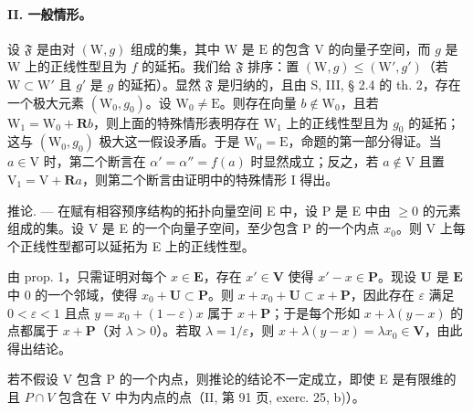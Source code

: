 \paragraph{II. 一般情形。}

设 \(\mathfrak{F}\) 是由对 \((\mathrm{W}, g)\) 组成的集，其中 \(\mathrm{W}\) 是 \(\mathrm{E}\) 的包含 \(\mathrm{V}\) 的向量子空间，而 \(g\) 是 \(\mathrm{W}\) 上的正线性型且为 \(f\) 的延拓。我们给 \(\mathfrak{F}\) 排序：置 \((\mathrm{W}, g) \leqslant (\mathrm{W}', g')\)（若 \(\mathrm{W} \subset \mathrm{W}'\) 且 \(g'\) 是 \(g\) 的延拓）。显然 \(\mathfrak{F}\) 是归纳的，且由 S, III, § 2.4 的 th. 2，存在一个极大元素 \((\mathrm{W}_0, g_0)\)。设 \(\mathrm{W}_0 \neq \mathrm{E}\)。则存在向量 \(b \notin \mathrm{W}_0\)，且若 \(\mathrm{W}_1 = \mathrm{W}_0 + \mathbf{R}b\)，则上面的特殊情形表明存在 \(\mathrm{W}_1\) 上的正线性型且为 \(g_0\) 的延拓；这与 \((\mathrm{W}_0, g_0)\) 极大这一假设矛盾。于是 \(\mathrm{W}_0 = \mathrm{E}\)，命题的第一部分得证。当 \(a \in \mathrm{V}\) 时，第二个断言在 \(\alpha' = \alpha'' = f(a)\) 时显然成立；反之，若 \(a \notin \mathrm{V}\) 且置 \(\mathrm{V}_1 = \mathrm{V} + \mathbf{R}a\)，则第二个断言由证明中的特殊情形 I 得出。

推论. --- 在赋有相容预序结构的拓扑向量空间 E 中，设 P 是 E 中由 \(\geqslant 0\) 的元素组成的集。设 V 是 E 的一个向量子空间，至少包含 P 的一个内点 \(x_{0}\)。则 V 上每个正线性型都可以延拓为 E 上的正线性型。

由 prop. 1，只需证明对每个 \(x \in \mathbf{E}\)，存在 \(x' \in \mathbf{V}\) 使得 \(x' - x \in \mathbf{P}\)。现设 \(\mathbf{U}\) 是 \(\mathbf{E}\) 中 0 的一个邻域，使得 \(x_0 + \mathbf{U} \subset \mathbf{P}\)。则 \(x + x_0 + \mathbf{U} \subset x + \mathbf{P}\)，因此存在 \(\varepsilon\) 满足 \(0 < \varepsilon < 1\) 且点 \(y = x_0 + (1 - \varepsilon)x\) 属于 \(x + \mathbf{P}\)；于是每个形如 \(x + \lambda(y - x)\) 的点都属于 \(x + \mathbf{P}\)（对 \(\lambda > 0\)）。若取 \(\lambda = 1 / \varepsilon\)，则 \(x + \lambda(y - x) = \lambda x_0 \in \mathbf{V}\)，由此得出结论。

若不假设 V 包含 P 的一个内点，则推论的结论不一定成立，即使 E 是有限维的且 \(P \cap V\) 包含在 V 中为内点的点（II, 第 91 页, exerc. 25, b)）。
